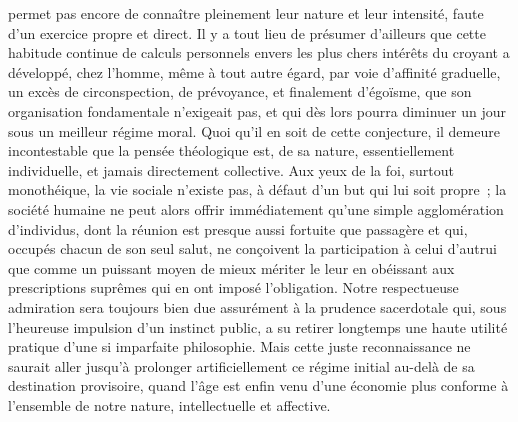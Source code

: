 \documentclass[french,twoside]{book} %
\begin{document}
permet pas encore de connaître pleinement leur nature et leur intensité, faute d’un exercice propre et direct. Il y a tout lieu de présumer d’ailleurs que cette habitude continue de calculs personnels envers les plus chers intérêts du croyant a développé, chez l’homme, même à tout autre égard, par voie d’affinité graduelle, un excès de circonspection, de prévoyance, et finalement d’égoïsme, que son organisation fondamentale n’exigeait pas, et qui dès lors pourra diminuer un jour sous un meilleur régime moral. Quoi qu’il en soit de cette conjecture, il demeure incontestable que la pensée théologique est, de sa nature, essentiellement individuelle, et jamais directement collective. Aux yeux de la foi, surtout monothéique, la vie sociale n’existe pas, à défaut d’un but qui lui soit propre ; la société humaine ne peut alors offrir immédiatement qu’une simple agglomération d’individus, dont la réunion est presque aussi fortuite que passagère et qui, occupés chacun de son seul salut, ne conçoivent la participation à celui d’autrui que comme un puissant moyen de mieux mériter le leur en obéissant aux prescriptions suprêmes qui en ont imposé l’obligation. Notre respectueuse admiration sera toujours bien due assurément à la prudence sacerdotale qui, sous l’heureuse impulsion d’un instinct public, a su retirer longtemps une haute utilité pratique d’une si imparfaite philosophie. Mais cette juste reconnaissance ne saurait aller jusqu’à prolonger artificiellement ce régime initial au-delà de sa destination provisoire, quand l’âge est enfin venu d’une économie plus conforme à l’ensemble de notre nature, intellectuelle et affective.\par
\end{document}
